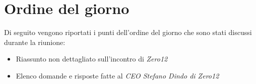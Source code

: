 \clearpage
\section{Ordine del giorno}
Di seguito vengono riportati i punti dell’ordine del giorno che sono stati discussi durante la riunione:
\begin{itemize}
	\item Riassunto non dettagliato sull'incontro di  \emph{Zero12}
	\item Elenco domande e risposte fatte al \emph{CEO Stefano Dindo di Zero12}
\end{itemize}